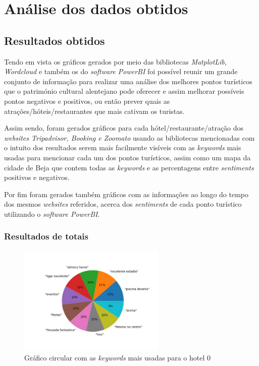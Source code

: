 \chapter{Análise dos dados obtidos}
\section{Resultados obtidos}

Tendo em vista os gráficos gerados por meio das bibliotecas \textit{MatplotLib, Wordcloud} e também os do \textit{software PowerBI}  foi possível reunir um grande conjunto de informação para realizar uma análise dos melhores pontos turísticos que o património cultural alentejano pode oferecer e assim melhorar possíveis pontos negativos e positivos, ou então prever quais as atrações/hóteis/restaurantes que mais cativam os turistas.

Assim sendo, foram gerados gráficos para cada hótel/restaurante/atração dos \textit{websites Tripadvisor, Booking e Zoomato} usando as bibliotecas mencionadas com o intuito dos resultados serem mais facilmente visíveis com as \textit{keywords} mais usadas para mencionar cada um dos pontos turísticos, assim como um mapa da cidade de Beja que contem todas as \textit{keywords} e as percentagens entre \textit{sentiments} positivos e negativos.

Por fim foram gerados também gráficos com as informações ao longo do tempo dos mesmos \textit{websites} referidos, acerca dos \textit{sentiments} de cada ponto turístico utilizando o \textit{software PowerBI}.

\newpage
\subsection{Resultados de totais}

\begin{figure}[!htb]
\centering
\includegraphics[width=7cm]{figuras/TripAdvisor/Hotels/hotel0_keywords.jpeg}
\caption{Gráfico circular com as \textit{keywords} mais usadas para o hotel 0}
\label{fig:exemplofig}
\end{figure}

